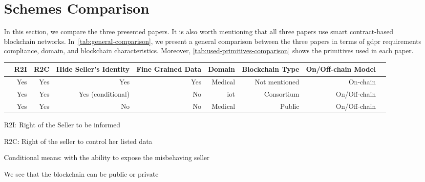 \section{Schemes Comparison}
\label{sec:schemes-comparison}

In this section, we compare the three presented papers.
It is also worth mentioning that all three papers use smart contract-based blockchain networks.
In~\cref{tab:general-comparison}, we present a general comparison between 
the three papers in terms of \ac{gdpr} requirements compliance, domain, and blockchain characteristics.
Moreover, \cref{tab:used-primitives-comparison} shows the primitives used in each paper.

\begin{table*}[h!]\centering
\caption{General schemes comparison}\label{tab:general-comparison}
\scriptsize
\begin{threeparttable}
\begin{tabular}{lrrrrrrrr}\toprule
&R2I\tnote{1} &R2C\tnote{2} &Hide Seller's Identity &Fine Grained Data &Domain &Blockchain Type &On/Off-chain Model \\\midrule
\cite{xue2023blockchain} &Yes &Yes &Yes &Yes &Medical &Not mentioned\tnote{4} &On-chain \\
\cite{liu2022blockchain} &Yes &Yes &Yes (conditional)\tnote{3} &No &\ac{iot} &Consortium &On/Off-chain \\
\cite{alsharif2020blockchain} &Yes &Yes &No &No &Medical &Public &On/Off-chain \\
\bottomrule
\end{tabular}
\begin{tablenotes}
    \item[1] R2I: Right of the Seller to be informed
    \item[2] R2C: Right of the seller to control her listed data
    \item[3] Conditional means: with the ability to expose the misbehaving seller
    \item[4] We see that the blockchain can be public or private
\end{tablenotes}
\end{threeparttable}
\end{table*}

